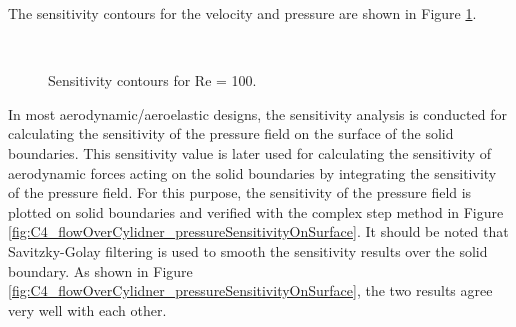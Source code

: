 %
The sensitivity contours for the velocity and pressure are shown in Figure \ref{fig:C4_flowOverCylinderSensitivityContour}.
%
\begin{figure}[H]
    \centering
    \quad
    \\
    \caption{Sensitivity contours for Re = 100.}
    \label{fig:C4_flowOverCylinderSensitivityContour}
\end{figure}
%
In most aerodynamic/aeroelastic designs, the sensitivity analysis is conducted for calculating the sensitivity of the pressure field on the surface of the solid boundaries. This sensitivity value is later used for calculating the sensitivity of aerodynamic forces acting on the solid boundaries by integrating the sensitivity of the pressure field. For this purpose, the sensitivity of the pressure field is plotted on solid boundaries and verified with the complex step method in Figure \ref{fig:C4_flowOverCylidner_pressureSensitivityOnSurface}. It should be noted that Savitzky-Golay filtering is used to smooth the sensitivity results over the solid boundary. As shown in Figure \ref{fig:C4_flowOverCylidner_pressureSensitivityOnSurface}, the two results agree very well with each other.
